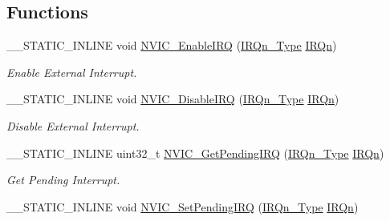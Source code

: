 \subsection*{Functions}
\begin{DoxyCompactItemize}
\item 
\+\_\+\+\_\+\+S\+T\+A\+T\+I\+C\+\_\+\+I\+N\+L\+I\+NE void \hyperlink{group___c_m_s_i_s___core___n_v_i_c_functions_ga3349f2e3580d7ce22d6530b7294e5921}{N\+V\+I\+C\+\_\+\+Enable\+I\+RQ} (\hyperlink{group___configuration__section__for___c_m_s_i_s_gac3af4a32370fb28c4ade8bf2add80251}{I\+R\+Qn\+\_\+\+Type} \hyperlink{group___configuration__section__for___c_m_s_i_s_ga666eb0caeb12ec0e281415592ae89083}{I\+R\+Qn})
\begin{DoxyCompactList}\small\item\em Enable External Interrupt. \end{DoxyCompactList}\item 
\+\_\+\+\_\+\+S\+T\+A\+T\+I\+C\+\_\+\+I\+N\+L\+I\+NE void \hyperlink{group___c_m_s_i_s___core___n_v_i_c_functions_ga260fba04ac8346855c57f091d4ee1e71}{N\+V\+I\+C\+\_\+\+Disable\+I\+RQ} (\hyperlink{group___configuration__section__for___c_m_s_i_s_gac3af4a32370fb28c4ade8bf2add80251}{I\+R\+Qn\+\_\+\+Type} \hyperlink{group___configuration__section__for___c_m_s_i_s_ga666eb0caeb12ec0e281415592ae89083}{I\+R\+Qn})
\begin{DoxyCompactList}\small\item\em Disable External Interrupt. \end{DoxyCompactList}\item 
\+\_\+\+\_\+\+S\+T\+A\+T\+I\+C\+\_\+\+I\+N\+L\+I\+NE uint32\+\_\+t \hyperlink{group___c_m_s_i_s___core___n_v_i_c_functions_gafec8042db64c0f8ed432b6c8386a05d8}{N\+V\+I\+C\+\_\+\+Get\+Pending\+I\+RQ} (\hyperlink{group___configuration__section__for___c_m_s_i_s_gac3af4a32370fb28c4ade8bf2add80251}{I\+R\+Qn\+\_\+\+Type} \hyperlink{group___configuration__section__for___c_m_s_i_s_ga666eb0caeb12ec0e281415592ae89083}{I\+R\+Qn})
\begin{DoxyCompactList}\small\item\em Get Pending Interrupt. \end{DoxyCompactList}\item 
\+\_\+\+\_\+\+S\+T\+A\+T\+I\+C\+\_\+\+I\+N\+L\+I\+NE void \hyperlink{group___c_m_s_i_s___core___n_v_i_c_functions_ga3ecf446519da33e1690deffbf5be505f}{N\+V\+I\+C\+\_\+\+Set\+Pending\+I\+RQ} (\hyperlink{group___configuration__section__for___c_m_s_i_s_gac3af4a32370fb28c4ade8bf2add80251}{I\+R\+Qn\+\_\+\+Type} \hyperlink{group___configuration__section__for___c_m_s_i_s_ga666eb0caeb12ec0e281415592ae89083}{I\+R\+Qn})

\end{DoxyCompactItemize}
